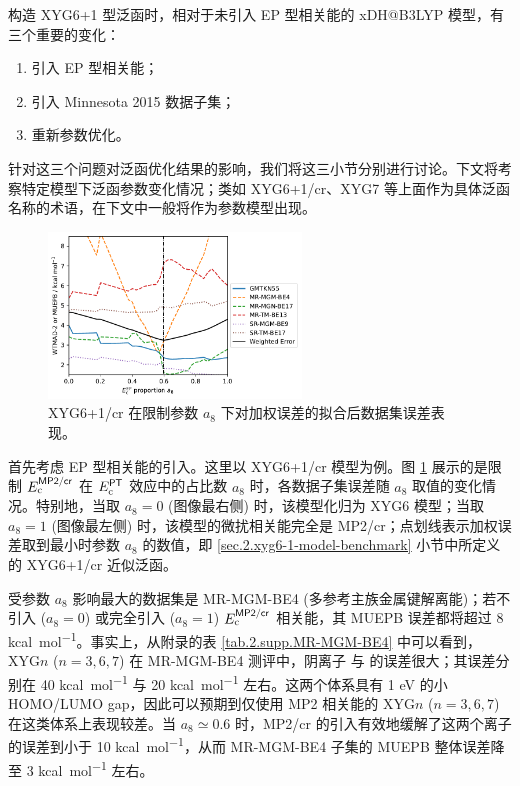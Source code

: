 构造 XYG6+1 型泛函时，相对于未引入 EP 型相关能的 xDH@B3LYP 模型，有三个重要的变化：
\begin{enumerate}[nosep]
  \item 引入 EP 型相关能；
  \item 引入 Minnesota 2015 数据子集；
  \item 重新参数优化。
\end{enumerate}
针对这三个问题对泛函优化结果的影响，我们将这三小节分别进行讨论。下文将考察特定模型下泛函参数变化情况；类如 XYG6+1/cr、XYG7 等上面作为具体泛函名称的术语，在下文中一般将作为参数模型出现。

\begin{figure}[h]
  \centering
  \includegraphics[width=0.6\textwidth]{assets/plot-seq-cr-proportion.pdf}
  \caption{XYG6+1/cr 在限制参数 $a_8$ 下对加权误差的拟合后数据集误差表现。}
  \label{fig.2.plot-seq-cr-proportion}
\end{figure}

首先考虑 EP 型相关能的引入。这里以 XYG6+1/cr 模型为例。图 \ref{fig.2.plot-seq-cr-proportion} 展示的是限制 $E_\mathrm{c}^{\textsf{MP2/cr}}$ 在 $E_\mathrm{c}^{\textsf{PT}}$ 效应中的占比数 $a_8$ 时，各数据子集误差随 $a_8$ 取值的变化情况。特别地，当取 $a_8 = 0$ (图像最右侧) 时，该模型化归为 XYG6 模型；当取 $a_8 = 1$ (图像最左侧) 时，该模型的微扰相关能完全是 MP2/cr；点划线表示加权误差取到最小时参数 $a_8$ 的数值，即 \ref{sec.2.xyg6-1-model-benchmark} 小节中所定义的 XYG6+1/cr 近似泛函。

受参数 $a_8$ 影响最大的数据集是 MR-MGM-BE4 (多参考主族金属键解离能)；若不引入 ($a_8 = 0$) 或完全引入 ($a_8 = 1$) $E_\mathrm{c}^{\textsf{MP2/cr}}$ 相关能，其 MUEPB 误差都将超过 8 \si{kcal.mol^{-1}}。事实上，从附录的表 \ref{tab.2.supp.MR-MGM-BE4} 中可以看到，XYG$n$ ($n=3,6,7$) 在 MR-MGM-BE4 测评中，阴离子  与  的误差很大；其误差分别在 40 \si{kcal.mol^{-1}} 与 20 \si{kcal.mol^{-1}} 左右。这两个体系具有 1 eV 的小 HOMO/LUMO gap，因此可以预期到仅使用 MP2 相关能的 XYG$n$ ($n=3,6,7$) 在这类体系上表现较差。当 $a_8 \simeq 0.6$ 时，MP2/cr 的引入有效地缓解了这两个离子的误差到小于 10 \si{kcal.mol^{-1}}，从而 MR-MGM-BE4 子集的 MUEPB 整体误差降至 3 \si{kcal.mol^{-1}} 左右。

